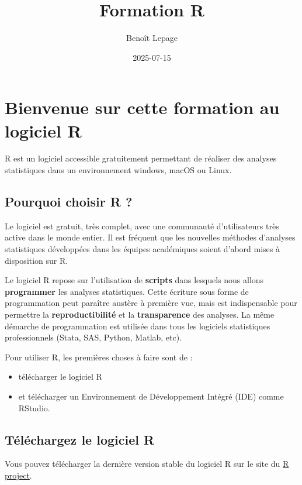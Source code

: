 \documentclass[
]{book}
\title{Formation R}
\author{Benoît Lepage}
\date{2025-07-15}
\providecommand{\tightlist}{%
  \setlength{\itemsep}{0pt}\setlength{\parskip}{0pt}}
\begin{document}
\maketitle

{
\setcounter{tocdepth}{1}
\tableofcontents
}
\chapter{Bienvenue sur cette formation au logiciel R}\label{bienvenue-sur-cette-formation-au-logiciel-r}

R est un logiciel accessible gratuitement permettant de réaliser des analyses statistiques dans un environnement windows, macOS ou Linux.

\section{Pourquoi choisir R ?}\label{pourquoi-choisir-r}

Le logiciel est gratuit, très complet, avec une communauté d'utilisateurs très active dans le monde entier. Il est fréquent que les nouvelles méthodes d'analyses statistiques développées dans les équipes académiques soient d'abord mises à disposition sur R.

Le logiciel R repose sur l'utilisation de \textbf{scripts} dans lesquels nous allons \textbf{programmer} les analyses statistiques. Cette écriture sous forme de programmation peut paraître austère à première vue, mais est indispensable pour permettre la \textbf{reproductibilité} et la \textbf{transparence} des analyses. La même démarche de programmation est utilisée dans tous les logiciels statistiques professionnels (Stata, SAS, Python, Matlab, etc).

Pour utiliser R, les premières choses à faire sont de :

\begin{itemize}
\tightlist
\item
  télécharger le logiciel R
\item
  et télécharger un Environnement de Développement Intégré (IDE) comme RStudio.
\end{itemize}

\section{Téléchargez le logiciel R}\label{tuxe9luxe9chargez-le-logiciel-r}

Vous pouvez télécharger la dernière version stable du logiciel R sur le site du \href{https://www.r-project.org/}{R project}.
\end{document}
